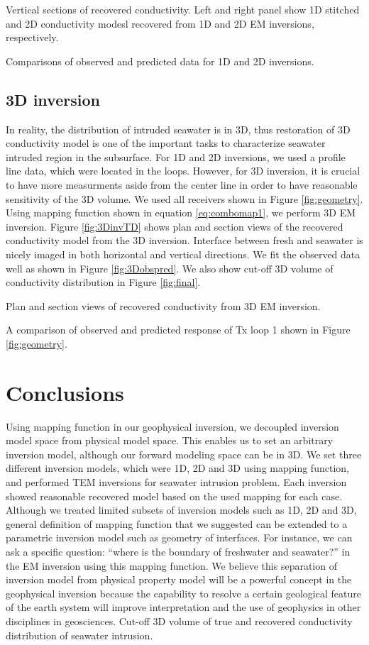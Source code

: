 \documentclass{segabs}
\begin{document}
{Vertical sections of recovered conductivity. Left and right panel show 1D stitched and 2D conductivity modesl recovered from 1D and 2D EM inversions, respectively.}

{Comparisons of observed and predicted data for 1D and 2D inversions. }

\subsection*{3D inversion}
In reality, the distribution of intruded seawater is in 3D, thus restoration of 3D conductivity model is one of the important tasks to characterize seawater intruded region in the subsurface. For 1D and 2D inversions, we used a profile line data, which were located in the loops. However, for 3D inversion, it is crucial to have more measurments aside from the center line in order to have reasonable sensitivity of the 3D volume. We used all receivers shown in Figure \ref{fig:geometry}. Using mapping function shown in equation \ref{eq:combomap1}, we perform 3D EM inversion. Figure \ref{fig:3DinvTD} shows plan and section views of the recovered conductivity model from the 3D inversion. Interface between fresh and seawater is nicely imaged in both horizontal and vertical directions. We fit the observed data well as shown in Figure \ref{fig:3Dobspred}. We also show cut-off 3D volume of conductivity distribution in Figure \ref{fig:final}.

{Plan and section views of recovered conductivity from 3D EM inversion.}

{A comparison of observed and predicted response of Tx loop 1 shown in Figure \ref{fig:geometry}.}

\section*{Conclusions}
Using mapping function in our geophysical inversion, we decoupled inversion model space from physical model space. This enables us to set an arbitrary inversion model, although our forward modeling space can be in 3D. We set three different inversion models, which were 1D, 2D and 3D using mapping function, and performed TEM inversions for seawater intrusion problem. Each inversion showed reasonable recovered model based on the used mapping for each case. Although we treated limited subsets of inversion models such as 1D, 2D and 3D, general definition of mapping function that we suggested can be extended to a parametric inversion model such as geometry of interfaces. For instance, we can ask a specific question: ``where is the boundary of freshwater and seawater?'' in the EM inversion using this mapping function. We believe this separation of inversion model from physical property model will be a powerful concept in the geophysical inversion because the capability to resolve a certain geological feature of the earth system  will improve interpretation and the use of geophysics in other disciplines in geosciences.
{Cut-off 3D volume of true and recovered conductivity distribution of seawater intrusion.}
\end{document}
